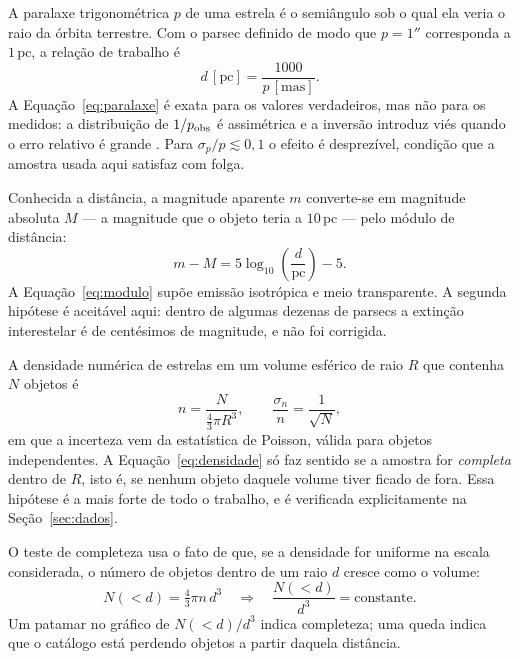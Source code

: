 \documentclass[10pt,a4paper,twocolumn]{article}
\begin{document}
A paralaxe trigonométrica $p$ de uma estrela é o semiângulo sob o qual ela
veria o raio da órbita terrestre. Com o parsec definido de modo que
$p=1''$ corresponda a $1\,\mathrm{pc}$, a relação de trabalho é
\begin{equation}
    d\,[\mathrm{pc}]=\frac{1000}{p\,[\mathrm{mas}]} .
    \label{eq:paralaxe}
\end{equation}
A Equação~\eqref{eq:paralaxe} é exata para os valores verdadeiros, mas não
para os medidos: a distribuição de $1/p_{\rm obs}$ é assimétrica e a
inversão introduz viés quando o erro relativo é grande \cite{luri}. Para
$\sigma_p/p\lesssim0{,}1$ o efeito é desprezível, condição que a amostra
usada aqui satisfaz com folga.

Conhecida a distância, a magnitude aparente $m$ converte-se em magnitude
absoluta $M$ --- a magnitude que o objeto teria a $10\,\mathrm{pc}$ ---
pelo módulo de distância:
\begin{equation}
    m-M=5\log_{10}\left(\frac{d}{\mathrm{pc}}\right)-5 .
    \label{eq:modulo}
\end{equation}
A Equação~\eqref{eq:modulo} supõe emissão isotrópica e meio transparente.
A segunda hipótese é aceitável aqui: dentro de algumas dezenas de parsecs
a extinção interestelar é de centésimos de magnitude, e não foi corrigida.

A densidade numérica de estrelas em um volume esférico de raio $R$ que
contenha $N$ objetos é
\begin{equation}
    n=\frac{N}{\tfrac{4}{3}\pi R^{3}} ,
    \qquad
    \frac{\sigma_n}{n}=\frac{1}{\sqrt{N}} ,
    \label{eq:densidade}
\end{equation}
em que a incerteza vem da estatística de Poisson, válida para objetos
independentes. A Equação~\eqref{eq:densidade} só faz sentido se a amostra
for \emph{completa} dentro de $R$, isto é, se nenhum objeto daquele volume
tiver ficado de fora. Essa hipótese é a mais forte de todo o trabalho, e é
verificada explicitamente na Seção~\ref{sec:dados}.

O teste de completeza usa o fato de que, se a densidade for uniforme na
escala considerada, o número de objetos dentro de um raio $d$ cresce como
o volume:
\begin{equation}
    N(<d)=\tfrac{4}{3}\pi n\,d^{3}
    \quad\Longrightarrow\quad
    \frac{N(<d)}{d^{3}}=\text{constante} .
    \label{eq:completeza}
\end{equation}
Um patamar no gráfico de $N(<d)/d^{3}$ indica completeza; uma queda indica
que o catálogo está perdendo objetos a partir daquela distância.
\end{document}
